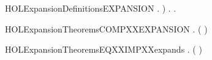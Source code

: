 \begin{SaveVerbatim}{HOLExpansionDefinitionsEXPANSION}
                   \HOLSymConst{\HOLTokenDisj{}} \HOLSymConst{\HOLTokenExists{}}.  \HOLTokenTransBegin\HOLConst{\ensuremath{\tau}}\HOLTokenTransEnd {} \HOLSymConst{\HOLTokenConj{}}   ) \HOLSymConst{\HOLTokenConj{}}
           \HOLSymConst{\HOLTokenForall{}}.  \HOLTokenTransBegin\HOLConst{\ensuremath{\tau}}\HOLTokenTransEnd {} \HOLSymConst{\HOLTokenImp{}} \HOLSymConst{\HOLTokenExists{}}.  \HOLTokenWeakTransBegin\HOLConst{\ensuremath{\tau}}\HOLTokenWeakTransEnd {} \HOLSymConst{\HOLTokenConj{}}   
\end{SaveVerbatim}
\newcommand{\HOLExpansionDefinitionsEXPANSION}{\UseVerbatim{HOLExpansionDefinitionsEXPANSION}}
\newcommand{\HOLExpansionDefinitions}{
\HOLDfnTag{Expansion}{expands_def}\HOLExpansionDefinitionsexpandsXXdef
\HOLDfnTag{Expansion}{EXPANSION}\HOLExpansionDefinitionsEXPANSION
}
\begin{SaveVerbatim}{HOLExpansionTheoremsCOMPXXEXPANSION}
\HOLTokenTurnstile{} \HOLSymConst{\HOLTokenForall{}} .
         \HOLSymConst{\HOLTokenConj{}}   \HOLSymConst{\HOLTokenImp{}}  (  )
\end{SaveVerbatim}
\newcommand{\HOLExpansionTheoremsCOMPXXEXPANSION}{\UseVerbatim{HOLExpansionTheoremsCOMPXXEXPANSION}}
\begin{SaveVerbatim}{HOLExpansionTheoremsEQXXIMPXXexpands}
\HOLTokenTurnstile{} \HOLSymConst{\HOLTokenForall{}} . ( \HOLSymConst{=} ) \HOLSymConst{\HOLTokenImp{}}   
\end{SaveVerbatim}
\newcommand{\HOLExpansionTheoremsEQXXIMPXXexpands}{\UseVerbatim{HOLExpansionTheoremsEQXXIMPXXexpands}}

